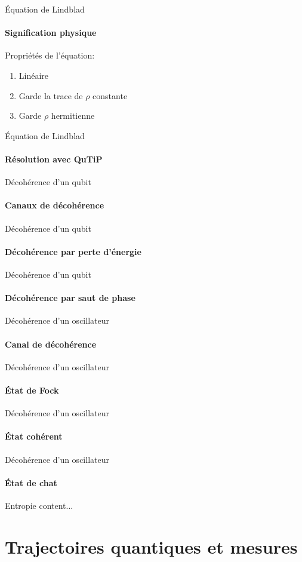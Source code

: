 \documentclass[11pt]{beamer}
\begin{document}
\begin{frame}{Équation de Lindblad}
\framesubtitle{Signification physique}
Propriétés de l'équation:
\begin{enumerate}
\item Linéaire
\item Garde la trace de $\rho$ constante
\item Garde $\rho$ hermitienne

\end{enumerate}
\end{frame}

\begin{frame}{Équation de Lindblad}
\framesubtitle{Résolution avec QuTiP}
\end{frame}

\begin{frame}{Décohérence d'un qubit}
\framesubtitle{Canaux de décohérence}
\end{frame}

\begin{frame}{Décohérence d'un qubit}
\framesubtitle{Décohérence par perte d'énergie}
\end{frame}

\begin{frame}{Décohérence d'un qubit}
\framesubtitle{Décohérence par saut de phase}
\end{frame}


\begin{frame}{Décohérence d'un oscillateur}
\framesubtitle{Canal de décohérence}
\end{frame}

\begin{frame}{Décohérence d'un oscillateur}
\framesubtitle{État de Fock}
\end{frame}

\begin{frame}{Décohérence d'un oscillateur}
\framesubtitle{État cohérent}
\end{frame}

\begin{frame}{Décohérence d'un oscillateur}
\framesubtitle{État de chat}
\end{frame}

\begin{frame}{Entropie}
content...
\end{frame}

\section{Trajectoires quantiques et mesures}
\end{document}
